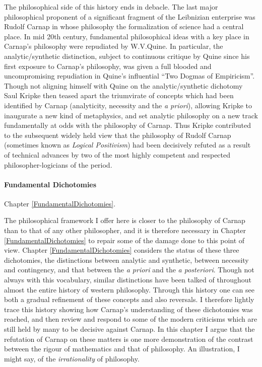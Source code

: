 The philosophical side of this history ends in debacle.
The last major philosophical proponent of a significant fragment of
the Leibnizian enterprise was Rudolf Carnap in whose philosophy the
formalization of science had a central place.
In mid 20th century, fundamental philosophical ideas with a key
place in Carnap's philosophy were repudiated by W.V.Quine.
In particular, the analytic/synthetic distinction, subject to
continuous critique by Quine since his first exposure to Carnap's
philosophy, was given a full blooded and uncompromising repudiation in
Quine's influential ``Two Dogmas of Empiricism''.
Though not aligning himself with Quine on the analytic/synthetic
dichotomy Saul Kripke then teased apart the triumvirate of concepts
which had been identified by Carnap (analyticity, necessity and the
\emph{a priori}), allowing Kripke to inaugurate a new kind of
metaphysics, and set analytic philosophy on a new track fundamentally
at odds with the philosophy of Carnap.
Thus Kripke contributed to the subsequent widely held view that the
philosophy of Rudolf Carnap (sometimes known as \emph{Logical
  Positivism}) had been decisively refuted as a result of technical
advances by two of the most highly competent and respected
philosopher-logicians of the period.

\paragraph{Fundamental Dichotomies}

Chapter \ref{FundamentalDichotomies}.

The philosophical framework I offer here is closer to the philosophy
of Carnap than to that of any other philosopher, and it is therefore
necessary in Chapter \ref{FundamentalDichotomies} to repair some of
the damage done to this point of view.
Chapter \ref{FundamentalDichotomies} considers the status of these three dichotomies, the
distinctions between analytic and synthetic, between necessity and
contingency, and that between the \emph{a priori} and the \emph{a posteriori}.
Though not always with this vocabulary, similar distinctions have been
talked of throughout almost the entire history of western philosophy.
Through this history one can see both a gradual refinement of these
concepts and also reversals.
I therefore lightly trace this history showing how Carnap's
understanding of these dichotomies was reached, and then review and
respond to some of the modern criticisms which are still held by many
to be decisive against Carnap.
In this chapter I argue that the refutation of Carnap on these matters
is one more demonstration of the contrast between the rigour of
mathematics and that of philosophy.
An illustration, I might say, of the \emph{irrationality} of philosophy.

